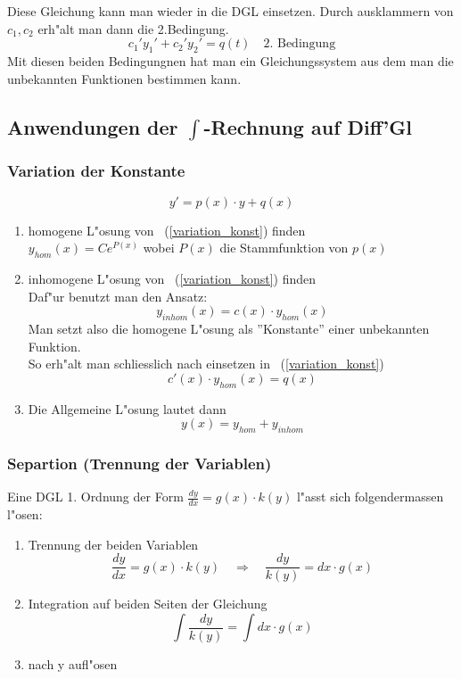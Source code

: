 \documentclass[german, 10pt, a4paper, twocolumn]{scrartcl}
\theoremstyle{definition}
\begin{document}
Diese Gleichung kann man wieder in die DGL einsetzen. Durch ausklammern von $c_1,c_2$ erh"alt man dann die 2.Bedingung.
$$c_1'y_1'+c_2'y_2'=q(t)\quad \mbox{2. Bedingung}$$
Mit diesen beiden Bedingungnen hat man ein Gleichungssystem aus dem man die unbekannten Funktionen bestimmen kann.

\subsection{Anwendungen der $\int$-Rechnung auf Diff'Gl}

\subsubsection{Variation der Konstante}

\begin{equation}
 \label{variation_konst}
 y'=p(x)\cdotp y + q(x)
\end{equation}

\begin{enumerate}
 \item homogene L"osung von ~(\ref{variation_konst}) finden\\
  $y_{hom}(x)=Ce^{P(x)}$ wobei $P(x)$ die Stammfunktion von $p(x)$
 \item inhomogene L"osung von ~(\ref{variation_konst}) finden\\
  Daf"ur benutzt man den Ansatz: 
  $$y_{inhom}(x)=c(x)\cdotp y_{hom}(x)$$
  Man setzt also die homogene L"osung als ''Konstante'' einer unbekannten Funktion.\\
  So erh"alt man schliesslich nach einsetzen in ~(\ref{variation_konst})
  $$c'(x)\cdotp y_{hom}(x)=q(x)$$
 \item Die Allgemeine L"osung lautet dann
  $$y(x)=y_{hom}+y_{inhom}$$
\end{enumerate}

\subsubsection{Separtion (Trennung der Variablen)}

Eine DGL 1. Ordnung der Form $\frac{dy}{dx}=g(x)\cdotp k(y)$ l"asst sich folgendermassen l"osen:
\begin{enumerate}
 \item Trennung der beiden Variablen
  $$\frac{dy}{dx}=g(x)\cdotp k(y)\quad\Rightarrow\quad \frac{dy}{k(y)}=dx\cdotp g(x)$$
 \item Integration auf beiden Seiten der Gleichung
  $$\int\frac{dy}{k(y)}=\int dx\cdotp g(x)$$
 \item nach y aufl"osen
\end{enumerate}
\end{document}
